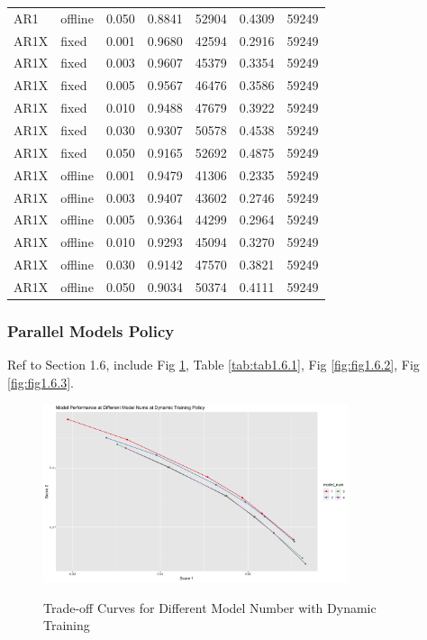\documentclass{article}
\begin{document}
\begin{longtable}[htbp]{l|l|l|*{4}{c}}
    AR1 & offline & 0.050 & 0.8841 & 52904 & 0.4309 & 59249\\
    AR1X & fixed & 0.001 & 0.9680 & 42594 & 0.2916 & 59249\\
    AR1X & fixed & 0.003 & 0.9607 & 45379 & 0.3354 & 59249\\
    AR1X & fixed & 0.005 & 0.9567 & 46476 & 0.3586 & 59249\\
    AR1X & fixed & 0.010 & 0.9488 & 47679 & 0.3922 & 59249\\
    AR1X & fixed & 0.030 & 0.9307 & 50578 & 0.4538 & 59249\\
    AR1X & fixed & 0.050 & 0.9165 & 52692 & 0.4875 & 59249\\
    AR1X & offline & 0.001 & 0.9479 & 41306 & 0.2335 & 59249\\
    AR1X & offline & 0.003 & 0.9407 & 43602 & 0.2746 & 59249\\
    AR1X & offline & 0.005 & 0.9364 & 44299 & 0.2964 & 59249\\
    AR1X & offline & 0.010 & 0.9293 & 45094 & 0.3270 & 59249\\
    AR1X & offline & 0.030 & 0.9142 & 47570 & 0.3821 & 59249\\
    AR1X & offline & 0.050 & 0.9034 & 50374 & 0.4111 & 59249\\
\end{longtable}

\subsubsection{Parallel Models Policy}
Ref to Section 1.6, include Fig \ref{fig:fig1.6.1}, Table \ref{tab:tab1.6.1}, Fig \ref{fig:fig1.6.2}, Fig \ref{fig:fig1.6.3}.

\begin{figure}
    \caption{Trade-off Curves for Different Model Number with Dynamic Training}
    \centering
    \includegraphics[width = 0.8\textwidth]{images/ModelPerformanceatDifferentModelNumsatDynamicTrainingPolicy.png}
    \label{fig:fig1.6.1}
\end{figure}
\end{document}
